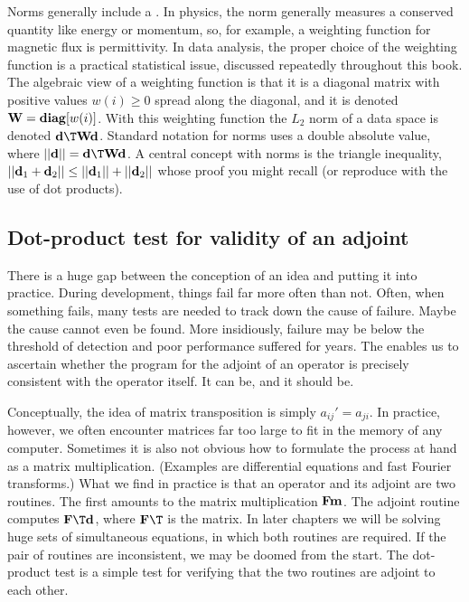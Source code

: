 \par
Norms generally include a .
In physics,
the norm generally measures a conserved quantity
like energy or momentum,
so, for example,
a weighting function for magnetic flux is permittivity.
In data analysis,
the proper choice of the weighting function is
a practical statistical issue,
discussed repeatedly throughout this book.
The algebraic view of a weighting function is that
it is a diagonal matrix
with positive values $w(i)\ge 0$ spread along the diagonal,
and it is denoted $\bold W = {\bf diag}[w(i)]$.
With this weighting function
the $L_2$ norm of a data space is denoted
$\bold d\T \bold W \bold d$.
Standard notation for norms uses a double absolute value,
where $||\bold d||=\bold d\T \bold W \bold d$.
A central concept with norms is the triangle inequality,
$ ||\bold d_1   +   \bold d_2|| \le ||\bold d_1|| + ||\bold d_2|| $
whose proof you might recall (or reproduce with the use of dot products).

\subsection{Dot-product test for validity of an adjoint}
\par
There is a huge gap between the
conception of an idea and putting it into practice.
During development, things fail far more often than not.
Often, when something fails,
many tests are needed to track down the cause of failure.
Maybe the cause cannot even be found.
More insidiously, failure may be below the threshold of detection
and poor performance suffered for years.
The 
enables us to ascertain whether
the program for the adjoint of an operator
is precisely consistent with the operator itself.
It can be, and it should be.

Conceptually, the idea of matrix transposition is simply ${a}_{ij}'=a_{ji}$.
In practice, however, we often encounter matrices far too large
to fit in the memory of any computer.
Sometimes it is also not obvious how to formulate the process at hand
as a matrix multiplication.
(Examples are differential equations and fast Fourier transforms.)
What we find in practice is that an operator and its adjoint 
are two routines. 
The first amounts to the matrix multiplication $ \bold F \bold m$.
The adjoint routine computes $\bold F\T \bold d$,
where $\bold F\T$ is the  matrix.
In later chapters we will be solving huge sets of simultaneous equations,
in which both routines are required.
If the pair of routines are inconsistent,
we may be doomed from the start.
The dot-product test is a simple test for verifying that the two 
routines are adjoint to each other.

